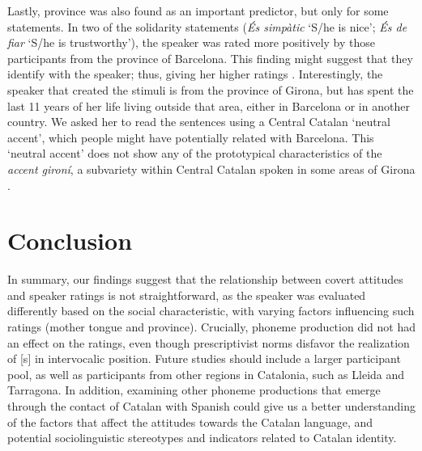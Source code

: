 \documentclass[
  a4paper,
  11pt,
  twocolumn]{article}
\begin{document}
Lastly, province was also found as an important predictor, but only for
some statements. In two of the solidarity statements (\emph{És simpàtic}
`S/he is nice'; \emph{És de fiar} `S/he is trustworthy'), the speaker
was rated more positively by those participants from the province of
Barcelona. This finding might suggest that they identify with the
speaker; thus, giving her higher ratings
\cite{ciller_fernandez_florez_2016} \cite{callesano_carter_2019}.
Interestingly, the speaker that created the stimuli is from the province
of Girona, but has spent the last 11 years of her life living outside
that area, either in Barcelona or in another country. We asked her to
read the sentences using a Central Catalan `neutral accent', which
people might have potentially related with Barcelona. This `neutral
accent' does not show any of the prototypical characteristics of the
\emph{accent gironí}, a subvariety within Central Catalan spoken in some
areas of Girona \cite{gros_2024}.

\section{Conclusion}

In summary, our findings suggest that the relationship between covert
attitudes and speaker ratings is not straightforward, as the speaker was
evaluated differently based on the social characteristic, with varying
factors influencing such ratings (mother tongue and province).
Crucially, phoneme production did not had an effect on the ratings, even
though prescriptivist norms disfavor the realization of {[}s{]} in
intervocalic position. Future studies should include a larger
participant pool, as well as participants from other regions in
Catalonia, such as Lleida and Tarragona. In addition, examining other
phoneme productions that emerge through the contact of Catalan with
Spanish could give us a better understanding of the factors that affect
the attitudes towards the Catalan language, and potential
sociolinguistic stereotypes and indicators related to Catalan identity.



\end{document}
